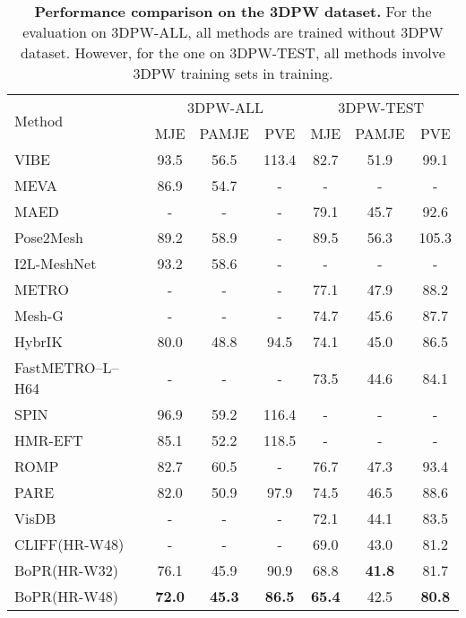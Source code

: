 \documentclass[10pt,twocolumn,letterpaper]{article}
\begin{document}
\begin{table*}
	\centering
\begin{tabular}{lcccccc}
        \toprule[1.5pt]
		\multirow{2}{*}{Method} & \multicolumn{3}{c}{3DPW-ALL}   & \multicolumn{3}{c}{3DPW-TEST} \\
		& MJE & PAMJE & PVE & MJE & PAMJE & PVE  \\ \hline
		VIBE~\cite{kocabas2020vibe} & 93.5 & 56.5 & 113.4 &82.7 &51.9 &99.1\\ 
		MEVA~\cite{luo20203d} & 86.9 & 54.7 & - &- &- &- \\
  MAED~\cite{wan2021encoder} & - & - & - &79.1 & 45.7 &92.6 \\ 
  \hline
		Pose2Mesh~\cite{choi2020pose2mesh} & 89.2 & 58.9 & -& 89.5 & 56.3&105.3 \\
		I2L-MeshNet~\cite{moon2020i2l} & 93.2 & 58.6 & - & -& -&- \\
            METRO~\cite{lin2021end} &- &- &- &77.1 &47.9 &88.2\\
            Mesh-G~\cite{lin2021mesh} &- &- &- &74.7 &45.6 &87.7\\
            HybrIK~\cite{li2021hybrik} & 80.0 & 48.8 & 94.5 & 74.1 & 45.0 & 86.5\\
            FastMETRO–L–H64~\cite{cho2022cross} &- &- &- &73.5 &44.6 &84.1\\
            \hline
		SPIN~\cite{kolotouros2019learning} & 96.9 & 59.2 &116.4 & -& -&-\\
		HMR-EFT~\cite{joo2020exemplar} &85.1 & 52.2 & 118.5 &- &- &-\\
		ROMP~\cite{sun2021monocular} & 82.7 & 60.5 & - & 76.7 & 47.3 & 93.4\\
		PARE~\cite{kocabas2021pare} & 82.0 & 50.9 & 97.9 & 74.5 & 46.5 & 88.6\\ 
            VisDB~\cite{yao2022learning} &- &- &- & 72.1 &44.1 &83.5\\
            CLIFF(HR-W48)~\cite{li2022cliff} & - & - & - & 69.0 & 43.0 & 81.2\\ \hline
		BoPR(HR-W32) & 76.1 & 45.9 & 90.9 & 68.8 & \textbf{41.8} & 81.7  \\
BoPR(HR-W48) & \textbf{72.0} & \textbf{45.3} & \textbf{86.5} & \textbf{65.4} & 42.5 & \textbf{80.8} \\ 
        \bottomrule[1.5pt]
	\end{tabular}
\caption{\textbf{Performance comparison on the 3DPW dataset.} For the evaluation on 3DPW-ALL, all methods are trained without 3DPW dataset. However, for the one on 3DPW-TEST, all methods involve 3DPW training sets in training. }
\label{tab:3dpw}
\end{table*}
\end{document}

